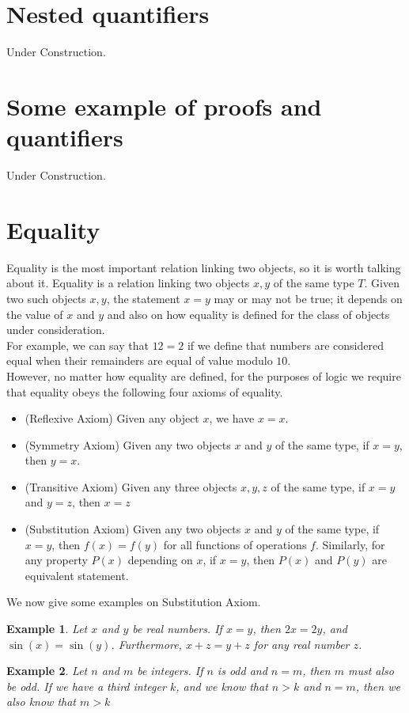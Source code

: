 \documentclass[a4paper,oneside]{book}
\newtheorem{example}{Example}[section]
\begin{document}
		\section{Nested quantifiers}
			Under Construction.
		\section{Some example of proofs and quantifiers}
			Under Construction.
		\section{Equality}
			Equality is the most important relation linking two objects, so it is worth talking about it. Equality is a relation linking two objects $x,y$ of the same type $T$. Given two such objects $x,y$, the statement $x=y$ may or may not be true; it depends on the value of $x$ and $y$ and also on how equality is defined for the class of objects under consideration.\\
			For example, we can say that $12=2$ if we define that numbers are considered equal when their remainders are equal of value modulo $10$.\\
			However, no matter how equality are defined, for the purposes of logic we require that equality obeys the following four axioms of equality.
			\begin{itemize}
				\item (Reflexive Axiom) Given any object $x$, we have $x=x$.
				\item (Symmetry Axiom) Given any two objects $x$ and $y$ of the same type, if $x=y$, then $y=x$.
				\item (Transitive Axiom) Given any three objects $x,y,z$ of the same type, if $x=y$ and $y=z$, then $x=z$
				\item (Substitution Axiom) Given any two objects $x$ and $y$ of the same type, if $x=y$, then $f(x)=f(y)$ for all functions of operations $f$. Similarly, for any property $P(x)$ depending on $x$, if $x=y$, then $P(x)$ and $P(y)$ are equivalent statement.
			\end{itemize}
			We now give some examples on Substitution Axiom.
			\begin{example}
				Let $x$ and $y$ be real numbers. If $x=y$, then $2x=2y$, and $\sin(x)=\sin(y)$. Furthermore, $x+z=y+z$ for any real number $z$.
			\end{example}
			\begin{example}
				Let $n$ and $m$ be integers. If $n$ is odd and $n=m$, then $m$ must also be odd. If we have a third integer $k$, and we know that $n>k$ and $n=m$, then we also know that $m>k$
			\end{example}
\end{document}
